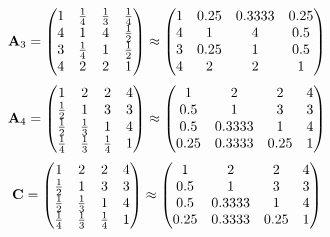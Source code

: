 \documentclass[10pt,a4paper]{article}
\begin{document}
	\[
		\bold{A}_{3} = 
		\begin{pmatrix}
			{1} {} & \frac{1} {{4}} & \frac{1} {{3}} & \frac{1} {{4}} \\
			{{4}} {} & {1} {} & {{4}} {} & \frac{1} {{2}} \\
			{{3}} {} & \frac{1} {{4}} & {1} {} & \frac{1} {{2}} \\
			{{4}} {} & {{2}} {} & {{2}} {} & {1} {} \\
		\end{pmatrix}
		\approx
		\begin{pmatrix}
			1        & 0.25     & 0.3333   & 0.25     \\
			4        & 1        & 4        & 0.5      \\
			3        & 0.25     & 1        & 0.5      \\
			4        & 2        & 2        & 1        \\
		\end{pmatrix}
	\]
	\[
		\bold{A}_{4} = 
		\begin{pmatrix}
			{1} {} & {{2}} {} & {{2}} {} & {{4}} {} \\
			\frac{1} {{2}} & {1} {} & {{3}} {} & {{3}} {} \\
			\frac{1} {{2}} & \frac{1} {{3}} & {1} {} & {{4}} {} \\
			\frac{1} {{4}} & \frac{1} {{3}} & \frac{1} {{4}} & {1} {} \\
		\end{pmatrix}
		\approx
		\begin{pmatrix}
			1        & 2        & 2        & 4        \\
			0.5      & 1        & 3        & 3        \\
			0.5      & 0.3333   & 1        & 4        \\
			0.25     & 0.3333   & 0.25     & 1        \\
		\end{pmatrix}
	\]
	\[
		\bold{C} = 
		\begin{pmatrix}
			{1} {} & {{2}} {} & {{2}} {} & {{4}} {} \\
			\frac{1} {{2}} & {1} {} & {{3}} {} & {{3}} {} \\
			\frac{1} {{2}} & \frac{1} {{3}} & {1} {} & {{4}} {} \\
			\frac{1} {{4}} & \frac{1} {{3}} & \frac{1} {{4}} & {1} {} \\
		\end{pmatrix}
		\approx
		\begin{pmatrix}
			1        & 2        & 2        & 4        \\
			0.5      & 1        & 3        & 3        \\
			0.5      & 0.3333   & 1        & 4        \\
			0.25     & 0.3333   & 0.25     & 1        \\
		\end{pmatrix}
	\]
\end{document}
